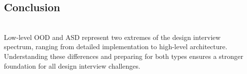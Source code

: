 \subsection{Conclusion}\label{oQLmLYVVgVpXPUuruR2wq}
\\
Low-level OOD and ASD represent two extremes of the design interview spectrum, ranging from detailed implementation to high-level architecture. Understanding these differences and preparing for both types ensures a stronger foundation for all design interview challenges.

